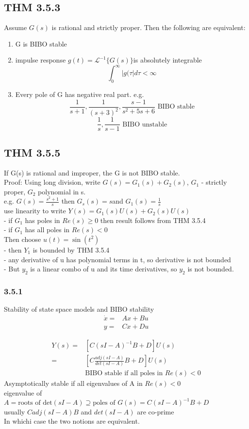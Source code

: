 \documentclass[letterpaper]{article}
\begin{document}
\subsection*{THM 3.5.3} Assume $G(s)$ is rational and strictly proper. Then the following are equivalent:
\begin{enumerate}
	\item G is BIBO stable
	\item impulse response $g(t)=\mathscr{L}^{-1}\{G(s)\}$is absolutely integrable
	      $$\int_0^{\infty}|g(\tau|d\tau<\infty$$
	\item Every pole of G has negative real part.
	      e.g. $$\frac{1}{s+1},\frac{1}{(s+3)^2},\frac{s-1}{s^2+5s+6}\text{ BIBO stable}$$
	      $$\frac{1}{s},\frac{1}{s-1} \text{ BIBO unstable}$$
\end{enumerate}
\subsection*{THM 3.5.5} If G(s) is rational and improper, the G is not BIBO stable.\\
Proof: Using long division, write $G(s)=G_1(s)+G_2(s)$, $G_1$ - strictly proper, $G_2$ polynomial in s.\\
e.g. $G(s)=\frac{s^2+1}{s}$ then $G_s(s)=s$and $G_1(s)=\frac{1}{s}$\\
use linearity to write $Y(s)=G_1(s)U(s)+G_2(s)U(s)$\\
- if $G_1$ has poles in $Re(s)\geq 0$ then result follows from THM 3.5.4\\
- if $G_1$ has all poles in $Re(s) < 0$\\
Then choose $u(t)=\sin(t^2)$\\
- then $Y_1$ is bounded by THM 3.5.4\\
- any derivative of u has polynomial terms in t, so derivative is not bounded\\
- But $y_2$ is a linear combo of u and its time derivatives, so $y_2$ is not bounded.
\subsubsection*{3.5.1} Stability of state space models and BIBO stability\\
\begin{align*}
	\dot x= & Ax+Bu \\
	y=      & Cx+Du 
\end{align*}

\begin{align*}
	Y(s)= & [C(sI-A)^{-1}B+D]U(s)                      \\
	=     & [C\frac{adj(sI-A)}{det(sI-A)}B+D]U(s)      \\
	      & \text{BIBO stable if all poles in }Re(s)<0 
\end{align*}
Asymptotically stable if all eigenvalues of A in $Re(s)<0$\\
eigenvalue of $A=\text{roots of det}(sI-A)\supseteq \text{poles of }G(s)=C(sI-A)^{-1}B+D$\\
usually $C adj(sI-A)B$ and $det(sI-A)$ are co-prime	\\
In whichi case the two notions are equivalent.
\end{document}
